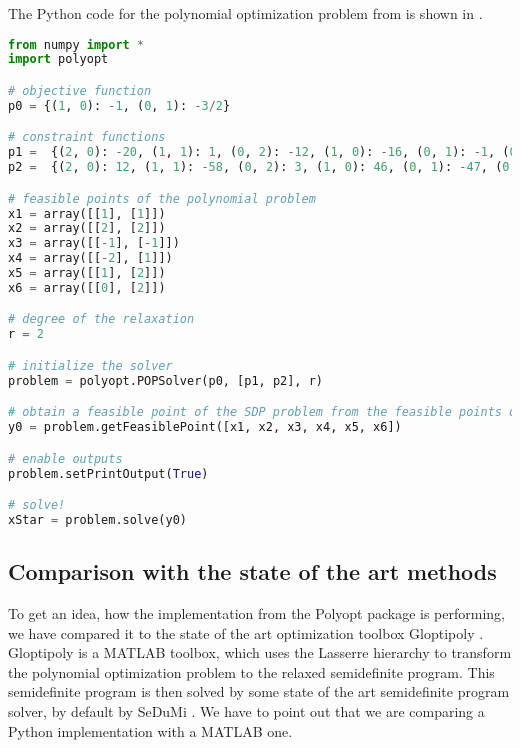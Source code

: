\begin{example}
The Python code for the polynomial optimization problem  from  is shown in .
  \begin{lstlisting}[float, language=python, caption={Code for solving polynomial optimization problem stated in \refex{POP:opt:ex}}, labellis={POP:opt:ex}]
from numpy import *
import polyopt

# objective function
p0 = {(1, 0): -1, (0, 1): -3/2}

# constraint functions
p1 =  {(2, 0): -20, (1, 1): 1, (0, 2): -12, (1, 0): -16, (0, 1): -1, (0, 0): 48}
p2 =  {(2, 0): 12, (1, 1): -58, (0, 2): 3, (1, 0): 46, (0, 1): -47, (0, 0): 44}

# feasible points of the polynomial problem
x1 = array([[1], [1]])
x2 = array([[2], [2]])
x3 = array([[-1], [-1]])
x4 = array([[-2], [1]])
x5 = array([[1], [2]])
x6 = array([[0], [2]])

# degree of the relaxation
r = 2

# initialize the solver
problem = polyopt.POPSolver(p0, [p1, p2], r)

# obtain a feasible point of the SDP problem from the feasible points of the polynomial problem
y0 = problem.getFeasiblePoint([x1, x2, x3, x4, x5, x6])

# enable outputs
problem.setPrintOutput(True)

# solve!
xStar = problem.solve(y0)
\end{lstlisting}
\end{example}

\subsection{Comparison with the state of the art methods}


To get an idea, how the implementation from the Polyopt package is performing, we have compared it to the state of the art optimization toolbox Gloptipoly \cite{gloptipoly}.
Gloptipoly is a MATLAB toolbox, which uses the Lasserre hierarchy to transform the polynomial optimization problem to the relaxed semidefinite program.
This semidefinite program is then solved by some state of the art semidefinite program solver, by default by SeDuMi \cite{sedumi}.
We have to point out that we are comparing a Python implementation with a MATLAB one.

